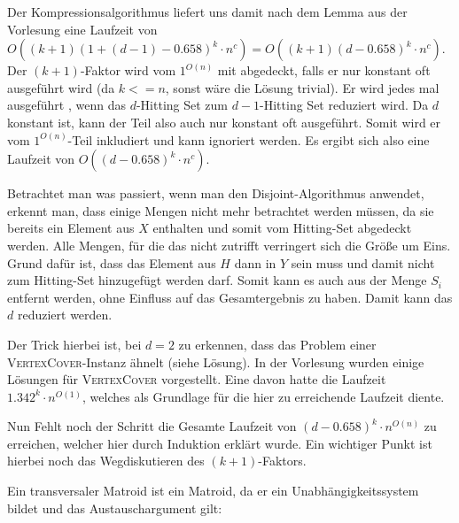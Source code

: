Der Kompressionsalgorithmus liefert uns damit nach dem Lemma aus der Vorlesung eine Laufzeit von $O((k+1)(1+(d-1)-0.658)^k \cdot n^c) = O((k+1)(d-0.658)^k \cdot n^c)$. Der $(k+1)$-Faktor wird vom $1^{O(n)}$ mit abgedeckt, falls er nur konstant oft ausgeführt wird (da $k <= n$, sonst wäre die Lösung trivial). Er wird jedes mal ausgeführt , wenn das $d$-Hitting Set zum $d-1$-Hitting Set reduziert wird. Da $d$ konstant ist, kann der Teil also auch nur konstant oft ausgeführt. Somit wird er vom $1^{O(n)}$-Teil inkludiert und kann ignoriert werden. Es ergibt sich also eine Laufzeit von $O((d-0.658)^k \cdot n^c)$.

\how
Betrachtet man was passiert, wenn man den Disjoint-Algorithmus anwendet, erkennt man, dass einige Mengen nicht mehr betrachtet werden müssen, da sie bereits ein Element aus $X$ enthalten und somit vom Hitting-Set abgedeckt werden. Alle Mengen, für die das nicht zutrifft verringert sich die Größe um Eins. Grund dafür ist, dass das Element aus $H$ dann in $Y$ sein muss und damit nicht zum Hitting-Set hinzugefügt werden darf. Somit kann es auch aus der Menge $S_i$ entfernt werden, ohne Einfluss auf das Gesamtergebnis zu haben. Damit kann das $d$ reduziert werden. 

Der Trick hierbei ist, bei $d=2$ zu erkennen, dass das Problem einer \textsc{VertexCover}-Instanz ähnelt (siehe Lösung). In der Vorlesung wurden einige Lösungen für \textsc{VertexCover} vorgestellt. Eine davon hatte die Laufzeit $1.342^k \cdot n^{O(1)}$, welches als Grundlage für die hier zu erreichende Laufzeit diente.

Nun Fehlt noch der Schritt die Gesamte Laufzeit von $(d-0.658)^k \cdot n^{O(n)}$ zu erreichen, welcher hier durch Induktion erklärt wurde. Ein wichtiger Punkt ist hierbei noch das Wegdiskutieren des $(k+1)$-Faktors.



\subexercise
Ein transversaler Matroid ist ein Matroid, da er ein Unabhängigkeitssystem bildet und das Austauschargument gilt:

